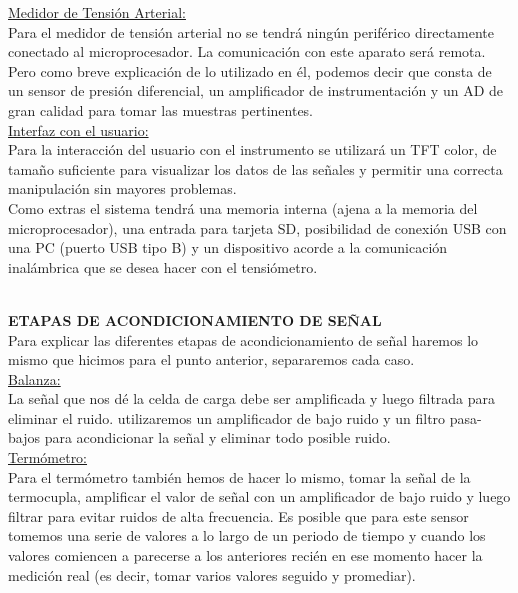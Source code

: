 \documentclass[11pt]{report}
\begin{document}
\noindent \underline{Medidor de Tensión Arterial:}\\
Para el medidor de tensión arterial no se tendrá ningún periférico directamente conectado al microprocesador. La comunicación con este aparato será remota. Pero como breve explicación de lo utilizado en él, podemos decir que consta de un sensor de presión diferencial, un amplificador de instrumentación y un AD de gran calidad para tomar las muestras pertinentes.\\

\noindent \underline{Interfaz con el usuario:}\\
Para la interacción del usuario con el instrumento se utilizará un TFT color, de tamaño suficiente para visualizar los datos de las señales y permitir una correcta manipulación sin mayores problemas. \\
Como extras el sistema tendrá una memoria interna (ajena a la memoria del microprocesador), una entrada para tarjeta SD, posibilidad de conexión USB con una PC (puerto USB tipo B) y un dispositivo acorde a la comunicación inalámbrica
que se desea hacer con el tensiómetro.\\

\hfill
\\ \hfill

 \noindent \large \textbf{ETAPAS DE ACONDICIONAMIENTO DE SEÑAL} \\

Para explicar las diferentes etapas de acondicionamiento de señal haremos lo mismo que hicimos para el punto anterior, separaremos cada caso.\\

\noindent \underline{Balanza:} \\
La señal que nos dé la celda de carga debe ser amplificada y luego filtrada para
eliminar el ruido. utilizaremos un amplificador de bajo ruido y un filtro pasa-bajos para acondicionar la señal y eliminar todo posible ruido.\\

\noindent \underline{Termómetro:} \\
Para el termómetro también hemos de hacer lo mismo, tomar la señal de la termocupla, amplificar el valor de señal con un amplificador de bajo ruido y luego filtrar para evitar ruidos de alta frecuencia. Es posible que para este sensor tomemos una serie de valores a lo largo de un periodo de tiempo y cuando los valores comiencen a parecerse a los anteriores recién en ese momento hacer la medición real (es decir, tomar varios valores seguido y promediar). \\
\end{document}
